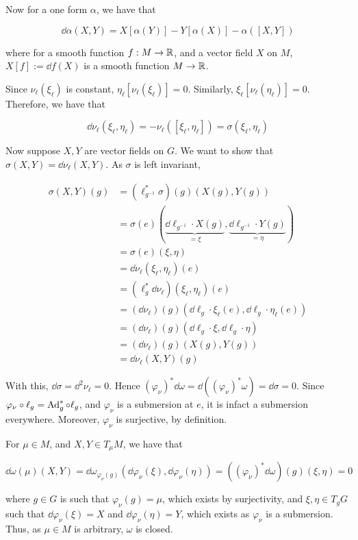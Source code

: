 \documentclass{article}
\begin{document}
Now for a one form \(\alpha\), we have that

\[\dd\alpha(X, Y) = X[\alpha(Y)] - Y[\alpha(X)] - \alpha([X, Y])\]

where for a smooth function \(f : M \to \mathbb{R}\), and a vector field \(X\) on \(M\), \(X[f] := \dd f(X)\) is a smooth function \(M \to \mathbb{R}\).

Since \(\nu_\ell(\xi_\ell)\) is constant, \(\eta_\ell[\nu_\ell(\xi_\ell)] = 0\). Similarly, \(\xi_\ell[\nu_\ell(\eta_\ell)] = 0\). Therefore, we have that

\[\dd \nu_\ell(\xi_\ell, \eta_\ell) = -\nu_\ell([\xi_\ell, \eta_\ell]) = \sigma(\xi_\ell, \eta_\ell)\]

Now suppose \(X, Y\) are vector fields on \(G\). We want to show that \(\sigma(X, Y) = \dd\nu_\ell(X, Y)\). As \(\sigma\) is left invariant,

\begin{align*}
    \sigma(X, Y)(g) &= (\ell_{g^{-1}}^* \sigma)(g)(X(g), Y(g)) \\
    &= \sigma(e)(\underbrace{\dd \ell_{g^{-1}} \cdot X(g)}_{=\xi}, \underbrace{\dd \ell_{g^{-1}} \cdot Y(g)}_{=\eta}) \\
    &= \sigma(e)(\xi, \eta) \\
    &= \dd\nu_\ell(\xi_\ell, \eta_\ell)(e) \\
    &= (\ell_g^*\dd\nu_\ell)(\xi_\ell, \eta_\ell)(e) \\
    &= (\dd\nu_\ell)(g)(\dd\ell_g\cdot \xi_\ell(e), \dd\ell_g\cdot\eta_\ell(e)) \\
    &= (\dd\nu_\ell)(g)(\dd \ell_g\cdot \xi, \dd\ell_g\cdot \eta) \\
    &= (\dd\nu_\ell)(g)(X(g), Y(g)) \\
    &= \dd\nu_\ell(X, Y)(g)
\end{align*}

With this, \(\dd\sigma = \dd^2\nu_\ell = 0\). Hence \((\varphi_\nu)^*\dd\omega = \dd((\varphi_\nu)^*\omega) = \dd\sigma = 0\). Since \(\varphi_\nu \circ \ell_g = \operatorname{Ad}_g^* \circ \ell_g\), and \(\varphi_\nu\) is a submersion at \(e\), it is infact a submersion everywhere. Moreover, \(\varphi_\nu\) is surjective, by definition.

For \(\mu \in  M\), and \(X, Y \in T_\mu  M\), we have that

\[\dd\omega(\mu)(X, Y) = \dd\omega_{\varphi_\nu(g)}(\dd\varphi_\nu(\xi), \dd\varphi_\nu(\eta)) = ((\varphi_\nu)^*\dd\omega)(g)(\xi, \eta) = 0\]

where \(g \in G\) is such that \(\varphi_\nu(g) = \mu\), which exists by surjectivity, and \(\xi, \eta \in T_gG\) such that \(\dd\varphi_\nu(\xi) = X\) and \(\dd\varphi_\nu(\eta) = Y\), which exists as \(\varphi_\nu\) is a submersion. Thus, as \(\mu \in  M\) is arbitrary, \(\omega\) is closed.
\end{document}
